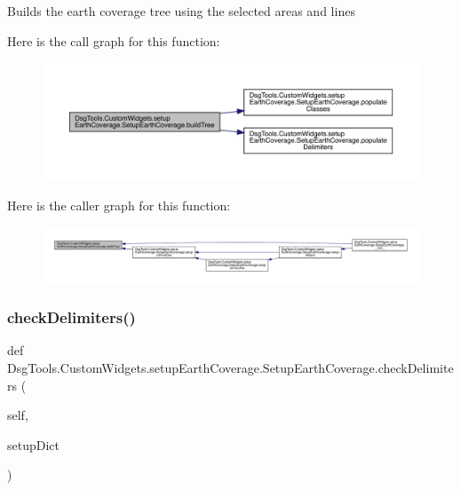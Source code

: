 \begin{DoxyVerb}Builds the earth coverage tree using the selected areas and lines
\end{DoxyVerb}
 Here is the call graph for this function\+:
\nopagebreak
\begin{figure}[H]
\begin{center}
\leavevmode
\includegraphics[width=350pt]{class_dsg_tools_1_1_custom_widgets_1_1setup_earth_coverage_1_1_setup_earth_coverage_aafb31efcb7b91af542b4f9ac3b393855_cgraph}
\end{center}
\end{figure}
Here is the caller graph for this function\+:
\nopagebreak
\begin{figure}[H]
\begin{center}
\leavevmode
\includegraphics[width=350pt]{class_dsg_tools_1_1_custom_widgets_1_1setup_earth_coverage_1_1_setup_earth_coverage_aafb31efcb7b91af542b4f9ac3b393855_icgraph}
\end{center}
\end{figure}
\mbox{\label{class_dsg_tools_1_1_custom_widgets_1_1setup_earth_coverage_1_1_setup_earth_coverage_a1689eadb2c927238bdfb4de47516e99c}} 
\subsubsection{\texorpdfstring{check\+Delimiters()}{checkDelimiters()}}
{\footnotesize\ttfamily def Dsg\+Tools.\+Custom\+Widgets.\+setup\+Earth\+Coverage.\+Setup\+Earth\+Coverage.\+check\+Delimiters (\begin{DoxyParamCaption}\item[{}]{self,  }\item[{}]{setup\+Dict }\end{DoxyParamCaption})}

